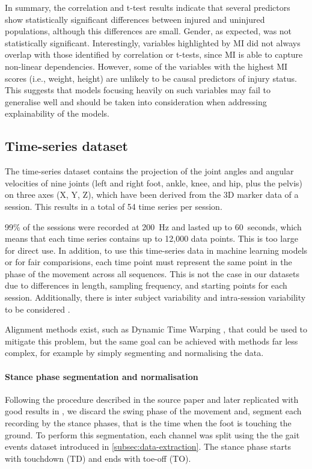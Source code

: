 In summary, the correlation and t-test results indicate that several predictors show statistically significant differences between injured and uninjured populations, although this differences are small. Gender, as expected, was not statistically significant. Interestingly, variables highlighted by MI did not always overlap with those identified by correlation or t-tests, since MI is able to capture non-linear dependencies. However, some of the variables with the highest MI scores (i.e., weight, height) are unlikely to be causal predictors of injury status. This suggests that models focusing heavily on such variables may fail to generalise well and should be taken into consideration when addressing explainability of the models.




\subsection{Time-series dataset}\label{subsec:method-ts-dataset}
The time-series dataset contains the projection of the joint angles and angular velocities of nine joints (left and right foot, ankle, knee, and hip, plus the pelvis) on three axes (X, Y, Z), which have been derived from the 3D marker data of a session. This results in a total of 54 time series per session.

99\% of the sessions were recorded at 200~Hz and lasted up to 60~seconds, which means that each time series contains up to 12,000 data points. This is too large for direct use. In addition, to use this time-series data in machine learning models or for fair comparisions, each time point must represent the same point in the phase of the movement across all sequences. This is not the case in our datasets due to differences in length, sampling frequency, and starting points for each session. Additionally, there is inter subject variability and intra-session variability to be considered \citep{Chau2005}.

Alignment methods exist, such as Dynamic Time Warping \citep{Bringmann2023}, that could be used to mitigate this problem, but the same goal can be achieved with methods far less complex, for example by simply segmenting and normalising the data.

\paragraph{Stance phase segmentation and normalisation}
Following the procedure described in the source paper \citep{Ferber2024} and later replicated with good results in \citep{FuentesJimnez2025}, we discard the swing phase of the movement and, segment each recording by the stance phases, that is the time when the foot is touching the ground. To perform this segmentation, each \gls{channel} was split using the the gait events dataset introduced in \ref{subsec:data-extraction}. The stance phase starts with touchdown (TD) and ends with toe-off (TO).

